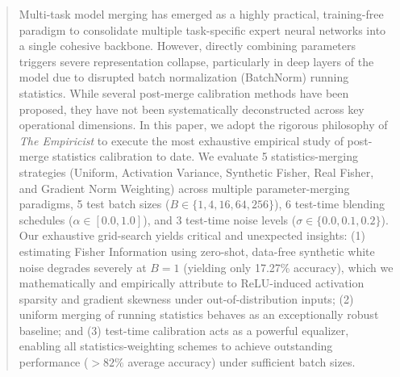 \documentclass{article}
\theoremstyle{plain}
\theoremstyle{definition}
\theoremstyle{remark}
\begin{document}

\printAffiliationsAndNotice{}

\begin{abstract}
Multi-task model merging has emerged as a highly practical, training-free paradigm to consolidate multiple task-specific expert neural networks into a single cohesive backbone. However, directly combining parameters triggers severe representation collapse, particularly in deep layers of the model due to disrupted batch normalization (BatchNorm) running statistics. While several post-merge calibration methods have been proposed, they have not been systematically deconstructed across key operational dimensions. In this paper, we adopt the rigorous philosophy of \textit{The Empiricist} to execute the most exhaustive empirical study of post-merge statistics calibration to date. We evaluate 5 statistics-merging strategies (Uniform, Activation Variance, Synthetic Fisher, Real Fisher, and Gradient Norm Weighting) across multiple parameter-merging paradigms, 5 test batch sizes ($B \in \{1, 4, 16, 64, 256\}$), 6 test-time blending schedules ($\alpha \in [0.0, 1.0]$), and 3 test-time noise levels ($\sigma \in \{0.0, 0.1, 0.2\}$). Our exhaustive grid-search yields critical and unexpected insights: (1) estimating Fisher Information using zero-shot, data-free synthetic white noise degrades severely at $B=1$ (yielding only 17.27\% accuracy), which we mathematically and empirically attribute to ReLU-induced activation sparsity and gradient skewness under out-of-distribution inputs; (2) uniform merging of running statistics behaves as an exceptionally robust baseline; and (3) test-time calibration acts as a powerful equalizer, enabling all statistics-weighting schemes to achieve outstanding performance ($>82\%$ average accuracy) under sufficient batch sizes.
\end{abstract}
\end{document}
